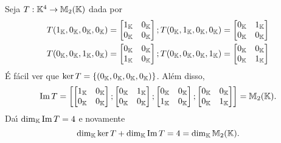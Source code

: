 \begin{exemplo}
  Seja $T : \mathbb{K}^4 \to \mathbb{M}_2(\mathbb{K})$ dada por
  \begin{align*}
    T(1_{\mathbb{K}},0_{\mathbb{K}},0_{\mathbb{K}},0_{\mathbb{K}}) &= \begin{bmatrix}
      1_{\mathbb{K}} & 0_{\mathbb{K}}\\
      0_{\mathbb{K}} & 0_{\mathbb{K}}
    \end{bmatrix}; T(0_{\mathbb{K}},1_{\mathbb{K}},0_{\mathbb{K}},0_{\mathbb{K}}) = \begin{bmatrix}
      0_{\mathbb{K}} & 1_{\mathbb{K}}\\
      0_{\mathbb{K}} & 0_{\mathbb{K}}
    \end{bmatrix}\\
    T(0_{\mathbb{K}},0_{\mathbb{K}},1_{\mathbb{K}},0_{\mathbb{K}}) &= \begin{bmatrix}
      0_{\mathbb{K}} & 0_{\mathbb{K}}\\
      1_{\mathbb{K}} & 0_{\mathbb{K}}
    \end{bmatrix}; T(0_{\mathbb{K}},0_{\mathbb{K}},0_{\mathbb{K}},1_{\mathbb{K}}) = \begin{bmatrix}
      0_{\mathbb{K}} & 0_{\mathbb{K}}\\
      0_{\mathbb{K}} & 1_{\mathbb{K}}
    \end{bmatrix}\\
  \end{align*}
  \'E f\'acil ver que $\ker T = \{(0_{\mathbb{K}},0_{\mathbb{K}},0_{\mathbb{K}},0_{\mathbb{K}})\}$. Al\'em disso,
  \[
    {\rm Im\,} T = \left[\begin{bmatrix}
      1_{\mathbb{K}} & 0_{\mathbb{K}}\\
      0_{\mathbb{K}} & 0_{\mathbb{K}}
    \end{bmatrix};\begin{bmatrix}
      0_{\mathbb{K}} & 1_{\mathbb{K}}\\
      0_{\mathbb{K}} & 0_{\mathbb{K}}
    \end{bmatrix};\begin{bmatrix}
      0_{\mathbb{K}} & 0_{\mathbb{K}}\\
      1_{\mathbb{K}} & 0_{\mathbb{K}}
    \end{bmatrix};\begin{bmatrix}
      0_{\mathbb{K}} & 0_{\mathbb{K}}\\
      0_{\mathbb{K}} & 1_{\mathbb{K}}
    \end{bmatrix}\right] = \mathbb{M}_2(\mathbb{K}).
  \]
  Da{\'\i} $\dim_{\mathbb{K}}{\rm Im\,} T = 4$ e novamente
  \[
    \dim_{\mathbb{K}}\ker T + \dim_{\mathbb{K}}{\rm Im\,} T = 4 = \dim_{\mathbb{K}}\mathbb{M}_2(\mathbb{K}).
  \]
\end{exemplo}

